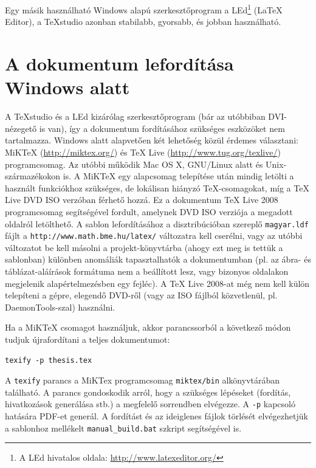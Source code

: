 Egy másik használható Windows alapú szerkesztőprogram a LEd\footnote{A LEd hivatalos oldala: \url{http://www.latexeditor.org/}} (LaTeX Editor), a TeXstudio azonban stabilabb, gyorsabb, és jobban használható.

\section{A dokumentum lefordítása Windows alatt}
A TeXstudio és a LEd kizárólag szerkesztőprogram (bár az utóbbiban DVI-nézegető is van), így a dokumentum fordításához szükséges eszközöket nem tartalmazza. Windows alatt alapvetően két lehetőség közül érdemes választani: MiKTeX (\url{http://miktex.org/}) és TeX Live (\url{http://www.tug.org/texlive/}) programcsomag. Az utóbbi működik Mac OS X, GNU/Linux alatt és Unix-származékokon is. A MiKTeX egy alapcsomag telepítése után mindig letölti a használt funkciókhoz szükséges, de lokálisan hiányzó \TeX-csomagokat, míg a TeX Live DVD ISO verzóban férhető hozzá. Ez a dokumentum TeX Live 2008 programcsomag segítségével fordult, amelynek DVD ISO verziója a megadott oldalról letölthető. A sablon lefordításához a disztribúcióban szereplő \verb+magyar.ldf+ fájlt a \verb+http://www.math.bme.hu/latex/+ változatra kell cserélni, vagy az utóbbi változatot be kell másolni a projekt-könyvtárba (ahogy ezt meg is tettük a sablonban) különben anomáliák tapasztalhatók a dokumentumban (pl. az ábra- és táblázat-aláírások formátuma nem a beállított lesz, vagy bizonyos oldalakon megjelenik alapértelmezésben egy fejléc). A TeX Live 2008-at még nem kell külön telepíteni a gépre, elegendő DVD-ről (vagy az ISO fájlból közvetlenül, pl. DaemonTools-szal) használni.

Ha a MiKTeX csomagot használjuk, akkor parancssorból a következő módon tudjuk újrafordítani a teljes dokumentumot:

\begin{lstlisting}[frame=single,float=!ht]
texify -p thesis.tex
\end{lstlisting}

A \verb+texify+ parancs a MiKTex programcsomag \verb+miktex/bin+ alkönyvtárában található. A parancs gondoskodik arról, hogy a szükséges lépéseket (fordítás, hivatkozások generálása stb.) a megfelelő sorrendben elvégezze. A \verb+-p+ kapcsoló hatására PDF-et generál. A fordítást és az ideiglenes fájlok törlését elvégezhetjük a sablonhoz mellékelt \verb+manual_build.bat+ szkript segítségével is.

